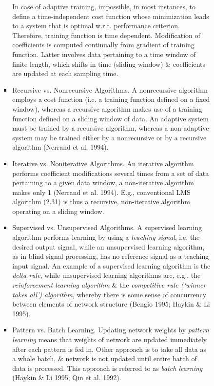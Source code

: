 \documentclass{article}
\begin{document}
\begin{enumerate}
\begin{itemize}
\begin{itemize}
\begin{itemize}
				In case of adaptive training, impossible, in most instances, to define a time-independent cost function whose minimization leads to a system that is optimal w.r.t. performance criterion. Therefore, training function is time dependent. Modification of coefficients is computed continually from gradient of training function. Latter involves data pertaining to a time window of finite length, which shifts in time (sliding window) \& coefficients are updated at each sampling time.
				\item {\sf Recursive vs. Nonrecursive Algorithms.} A nonrecursive algorithm employs a cost function (i.e. a training function defined on a fixed window), whereas a recursive algorithm makes use of a training function defined on a sliding window of data. An adaptive system must be trained by a recursive algorithm, whereas a non-adaptive system may be trained either by a nonrecursive or by a recursive algorithm (Nerrand et al. 1994).
				\item {\sf Iterative vs. Noniterative Algorithms.} An iterative algorithm performs coefficient modifications several times from a set of data pertaining to a given data window, a non-iterative algorithm makes only 1 (Nerrand et al. 1994). E.g., conventional LMS algorithm (2.31) is thus a recursive, non-iterative algorithm operating on a sliding window.
				\item {\sf Supervised vs. Unsupervised Algorithms.} A supervised learning algorithm performs learning by using a {\it teaching signal}, i.e. the desired output signal, while an unsupervised learning algorithm, as in blind signal processing, has no reference signal as a teaching input signal. An example of a supervised learning algorithm is the {\it delta rule}, while unsupervised learning algorithms are, e.g., the {\it reinforcement learning algorithm} \& the {\it competitive rule (`winner takes all') algorithm}, whereby there is some sense of concurrency between elements of network structure (Bengio 1995; Haykin \& Li 1995).
				\item {\sf Pattern vs. Batch Learning.} Updating network weights by {\it pattern learning} means that weights of network are updated immediately after each pattern is fed in. Other approach is to take all data as a whole batch, \& network is not updated until entire batch of data is processed. This approach is referred to as {\it batch learning} (Haykin \& Li 1995; Qin et al. 1992).
				

\end{itemize}
\end{itemize}
\end{itemize}
\end{enumerate}
\end{document}
